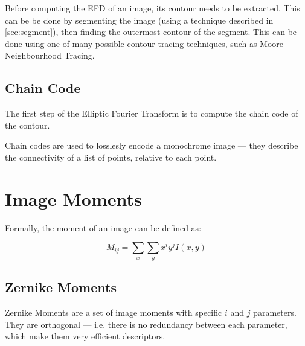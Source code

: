 Before computing the EFD of an image, its contour needs to be extracted. This can be be done by segmenting the image (using a technique described in \ref{sec:segment}), then finding the outermost contour of the segment. This can be done using one of many possible contour tracing techniques, such as Moore Neighbourhood Tracing.

\subsection{Chain Code}
The first step of the Elliptic Fourier Transform is to compute the chain code of the contour.

Chain codes are used to losslesly encode a monochrome image --- they describe the connectivity of a list of points, relative to each point.

\section{Image Moments}
Formally, the moment of an image can be defined as:

\begin{equation}
M_{ij} = \sum_x \sum_y x^i y^j I(x,y)\,\!
\end{equation}


\subsection{Zernike Moments}
\label{sec:zernike}
Zernike Moments are a set of image moments with specific $i$ and $j$ parameters. They are orthogonal --- i.e. there is no redundancy between each parameter, which make them very efficient descriptors.
